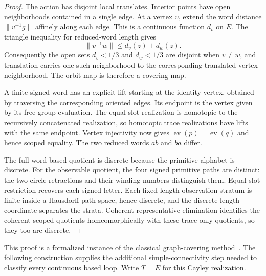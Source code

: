 \documentclass[10pt,reqno]{amsart}
\theoremstyle{definition}
\theoremstyle{plain}
\theoremstyle{remark}
\begin{document}
\begin{proof}
The action has disjoint local translates.  Interior points have open
neighborhoods contained in a single edge.  At a vertex $v$, extend the
word distance $\|v^{-1}g\|$ affinely along each edge.  This is a continuous
function $d_v$ on $E$.  The triangle inequality for reduced-word length
gives
\[
  \|v^{-1}w\|\le d_v(z)+d_w(z).
\]
Consequently the open sets $d_v<1/3$ and $d_w<1/3$ are disjoint when
$v\ne w$, and translation carries one such neighborhood to the
corresponding translated vertex neighborhood.  The orbit map is therefore
a covering map.

A finite signed word has an explicit lift starting at the identity
vertex, obtained by traversing the corresponding oriented edges.  Its
endpoint is the vertex given by its free-group evaluation.  The
equal-slot realization is homotopic to the recursively concatenated
realization, so homotopic trace realizations have lifts with the same
endpoint.  Vertex injectivity now gives
$\operatorname{ev}(p)=\operatorname{ev}(q)$ and hence scoped equality.
The two reduced words $ab$ and $ba$ differ.

The full-word based quotient is discrete because the primitive alphabet
is discrete.  For the observable quotient, the four signed primitive
paths are distinct: the two circle retractions and their winding numbers
distinguish them.  Equal-slot restriction recovers each signed letter.
Each fixed-length observation stratum is finite inside a Hausdorff path
space, hence discrete, and the discrete length coordinate separates the
strata.  Coherent-representative elimination identifies the coherent scoped
quotients homeomorphically with these trace-only quotients, so they too are
discrete.
\end{proof}

This proof is a formalized instance of the classical graph-covering
method~\cite[Section~1.A]{Hatcher02}.  The following construction supplies
the additional simple-connectivity step needed to classify every continuous
based loop. Write $T=E$ for this Cayley realization.
\end{document}

